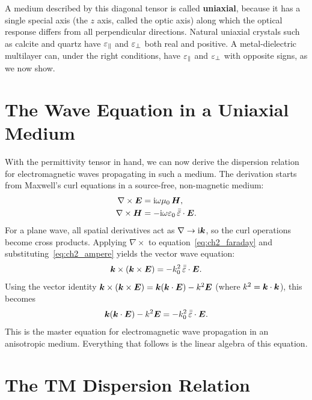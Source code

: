A medium described by this diagonal tensor is called
\textbf{uniaxial}, because it has a single special axis (the $z$ axis,
called the optic axis) along which the optical response differs from all
perpendicular directions. Natural uniaxial crystals such as calcite and
quartz have $\varepsilon_{\parallel}$ and $\varepsilon_{\perp}$ both real and positive. A
metal-dielectric multilayer can, under the right conditions, have $\varepsilon_{\parallel}$
and $\varepsilon_{\perp}$ with opposite signs, as we now show.

\section{The Wave Equation in a Uniaxial Medium}

With the permittivity tensor in hand, we can now derive the dispersion
relation for electromagnetic waves propagating in such a medium. The
derivation starts from Maxwell's curl equations in a source-free,
non-magnetic medium:
\begin{align}
  \nabla \times \bm{E} &= \mathrm{i}\omega\mu_0\,\bm{H},
  \label{eq:ch2_faraday} \\
  \nabla \times \bm{H} &= -\mathrm{i}\omega\varepsilon_0\,\bar{\bar{\varepsilon}}\cdot\bm{E}.
  \label{eq:ch2_ampere}
\end{align}
For a plane wave, all spatial derivatives act as $\nabla \to \mathrm{i}\bm{k}$, so
the curl operations become cross products. Applying $\nabla\times$ to
equation~\eqref{eq:ch2_faraday} and substituting~\eqref{eq:ch2_ampere}
yields the vector wave equation:
\begin{equation}
  \bm{k} \times (\bm{k} \times \bm{E}) = -k_0^2\,\bar{\bar{\varepsilon}}\cdot\bm{E}.
  \label{eq:ch2_wave_eq_raw}
\end{equation}
Using the vector identity $\bm{k} \times (\bm{k} \times \bm{E}) =
\bm{k}(\bm{k}\cdot\bm{E}) - k^2\bm{E}$ (where $k^2 = \bm{k}\cdot\bm{k}$),
this becomes
\begin{equation}
  \bm{k}(\bm{k}\cdot\bm{E}) - k^2\bm{E} = -k_0^2\,\bar{\bar{\varepsilon}}\cdot\bm{E}.
  \label{eq:ch2_master}
\end{equation}
This is the master equation for electromagnetic wave propagation in an
anisotropic medium. Everything that follows is the linear algebra of this
equation.

\section{The TM Dispersion Relation}

